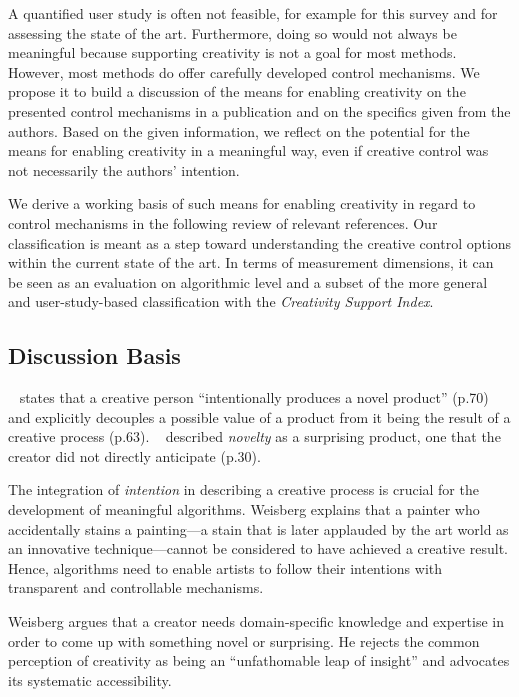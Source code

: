 A quantified user study is often not feasible, for example for this survey and for assessing the state of the art. Furthermore, doing so would not always be meaningful because supporting creativity is not a goal for most methods. However, most methods do offer carefully developed control mechanisms. We propose it to build a discussion of the means for enabling creativity on the presented control mechanisms in a publication and on the specifics given from the authors. Based on the given information, we reflect on the potential for the means for enabling creativity in a meaningful way, even if creative control was not necessarily the authors' intention. 

We derive a working basis of such means for enabling creativity in regard to control mechanisms in the following review of relevant references. Our classification is meant as a step toward understanding the creative control options within the current state of the art. In terms of measurement dimensions, it can be seen as an evaluation on algorithmic level and a subset of the more general and user-study-based classification with the \textit{Creativity Support Index}. 

\subsection{Discussion Basis}\label{subsec:creative_means}

\citeauthor*{weisberg_2006_cui}~\cite{weisberg_2006_cui} states that a creative person ``intentionally produces a novel product'' (p.70) and explicitly decouples a possible value of a product from it being the result of a creative process (p.63). 
\citeauthor*{boden_2010_cat}~\cite{boden_2010_cat} described \textit{novelty} as a surprising product, one that the creator did not directly anticipate (p.30). 


The integration of \textit{intention} in describing a creative process is crucial for the development of meaningful algorithms. Weisberg explains that a painter who accidentally stains a painting---a stain that is later applauded by the art world as an innovative technique---cannot be considered to have achieved a creative result. Hence, algorithms need to enable artists to follow their intentions with transparent and controllable mechanisms. 

Weisberg argues that a creator needs domain-specific knowledge and expertise in order to come up with something novel or surprising. He rejects the common perception of creativity as being an ``unfathomable leap of insight'' and advocates its systematic accessibility. 

